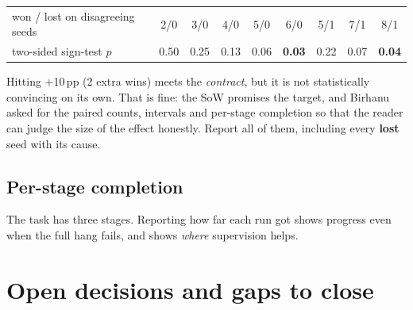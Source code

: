 \documentclass[11pt,a4paper]{article}
\begin{document}
\begin{center}\small
\begin{tabular}{@{}lcccccccc@{}}
\toprule
won / lost on disagreeing seeds & 2/0 & 3/0 & 4/0 & 5/0 & 6/0 & 5/1 & 7/1 & 8/1\\
two-sided sign-test $p$ & 0.50 & 0.25 & 0.13 & 0.06 & \textbf{0.03} & 0.22 & 0.07 & \textbf{0.04}\\
\bottomrule
\end{tabular}
\end{center}

\begin{keyidea}
Hitting +10\,pp (2 extra wins) meets the \emph{contract}, but it is not statistically convincing on its own. That is
fine: the SoW promises the target, and Birhanu asked for the paired counts, intervals and per-stage completion so that the
reader can judge the size of the effect honestly. Report all of them, including every \textbf{lost} seed with its cause.
\end{keyidea}

\subsection{Per-stage completion}

The task has three stages. Reporting how far each run got shows progress even when the full hang fails, and shows
\emph{where} supervision helps.

\begin{center}
\end{center}

\section{Open decisions and gaps to close}\label{sec:open}
\end{document}
